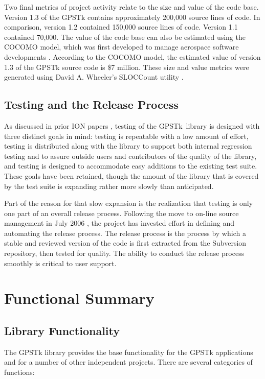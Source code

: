 \documentclass[letterpaper,ugly,10pt]{ion-gps}
\begin{document}
Two final metrics of project activity relate to the size and value of the code base. Version 1.3 of the GPSTk contains approximately 200,000 source lines of code. In comparison, version 1.2 contained 150,000 source lines of code. Version 1.1 contained 70,000. The value of the code base can also be estimated using the COCOMO model, which was first developed to manage aerospace software developments \cite{cocomomodel}. According to the COCOMO model, the estimated value of version 1.3 of the GPSTk source code is \$7 million. These size and value metrics were generated using David A. Wheeler's SLOCCount utility \cite{sloccount}.

\subsection*{Testing and the Release Process}

As discussed in prior ION papers \cite{ion:gnss06}, testing of the \mbox{GPSTk library} is designed with three distinct goals in mind: testing is repeatable with a low amount of effort, testing is distributed along with the library to support both internal regression testing and to assure outside users and contributors of the quality of the library, and testing is designed to accommodate easy additions to the existing test suite.  These goals have been retained, though the amount of the library that is covered by the test suite is expanding rather more slowly than anticipated. 

Part of the reason for that slow expansion is the realization that testing is only one part of an overall release process.  Following the move to on-line source management in July 2006 \cite{ion:gnss06}, the project has invested effort in defining and automating the release process. The release process is the process by which a stable and reviewed version of the code is first extracted from the Subversion repository, then tested for quality. The ability to conduct the release process smoothly is critical to user support.

\section*{Functional Summary}

\subsection*{Library Functionality}

The GPSTk library provides the base functionality for the GPSTk applications and for a number of other independent projects. There are several categories of functions:
\end{document}

